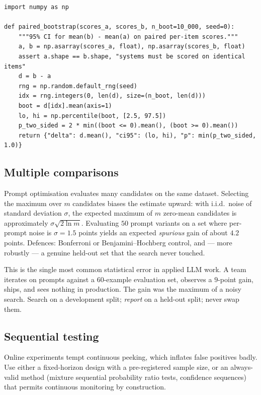 \documentclass[11pt,twoside,openright]{book}
\theoremstyle{definition}
\theoremstyle{plain}
\theoremstyle{remark}
\begin{document}
\begin{lstlisting}[style=py, caption={Paired bootstrap for the difference between
two systems on the same inputs. The pairing removes item difficulty as a source
of variance and is worth roughly an order of magnitude in required sample size.}]
import numpy as np

def paired_bootstrap(scores_a, scores_b, n_boot=10_000, seed=0):
    """95% CI for mean(b) - mean(a) on paired per-item scores."""
    a, b = np.asarray(scores_a, float), np.asarray(scores_b, float)
    assert a.shape == b.shape, "systems must be scored on identical items"
    d = b - a
    rng = np.random.default_rng(seed)
    idx = rng.integers(0, len(d), size=(n_boot, len(d)))
    boot = d[idx].mean(axis=1)
    lo, hi = np.percentile(boot, [2.5, 97.5])
    p_two_sided = 2 * min((boot <= 0).mean(), (boot >= 0).mean())
    return {"delta": d.mean(), "ci95": (lo, hi), "p": min(p_two_sided, 1.0)}
\end{lstlisting}

\subsection{Multiple comparisons}

Prompt optimisation evaluates many candidates on the same dataset. Selecting the
maximum over $m$ candidates biases the estimate upward: with i.i.d.\ noise of
standard deviation $\sigma$, the expected maximum of $m$ zero-mean candidates is
approximately $\sigma\sqrt{2\ln m}$. Evaluating $50$ prompt variants on a set
where per-prompt noise is $\sigma = 1.5$ points yields an expected
\emph{spurious} gain of about $4.2$ points. Defences: Bonferroni or
Benjamini--Hochberg control, and --- more robustly --- a genuine held-out set
that the search never touched.

\begin{caution}
This is the single most common statistical error in applied LLM work. A team
iterates on prompts against a 60-example evaluation set, observes a $9$-point
gain, ships, and sees nothing in production. The gain was the maximum of a noisy
search. Search on a development split; \emph{report} on a held-out split; never
swap them.
\end{caution}

\subsection{Sequential testing}

Online experiments tempt continuous peeking, which inflates false positives
badly. Use either a fixed-horizon design with a pre-registered sample size, or
an always-valid method (mixture sequential probability ratio tests, confidence
sequences) that permits continuous monitoring by construction.
\end{document}
